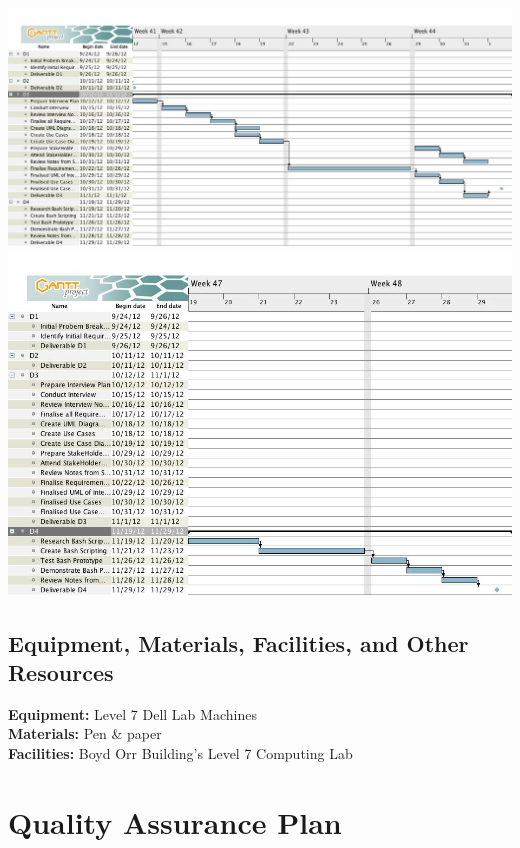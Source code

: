 \documentclass{l3deliverable}
\begin{document}
{\includegraphics[scale=0.3]{img/GANTTD3.jpg}\\
\includegraphics[scale=0.5]{img/GANTTD4.jpg}\\




\subsection{Equipment, Materials, Facilities, and Other Resources}
\textbf{Equipment:} Level 7 Dell Lab Machines\\
\textbf{Materials:} Pen \& paper\\
\textbf{Facilities:} Boyd Orr Building's Level 7 Computing Lab\\


\section{Quality Assurance Plan}

}
\end{document}
